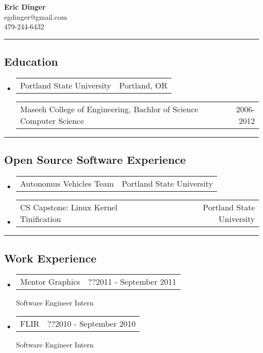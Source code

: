 \documentclass[10pt,letterpaper]{article}
\author{Eric Dinger}
\makeatletter
\newcommand{\heading}[2]
{\begin{tabular*}{\linewidth}{l@{\extracolsep{\fill}}r}
#1 &
#2 \\
\end{tabular*}}
\makeatother
\begin{document}
{\LARGE
\textbf{Eric Dinger}\\
egdinger@gmail.com\\
479-244-6432}
\vspace{.5em}
\hrule
\vspace{-.5em}

\subsection*{Education}
	\begin{itemize}
	\item
		\heading
			{Portland State University}
			{Portland, OR}
		\heading 
			{Maseeh College of Engineering, Bachlor of Science Computer Science}
			{2006-2012}
	\end{itemize}

\hrule

\subsection*{Open Source Software Experience}
	\begin{itemize}
		\item 
		\heading
			{ Autonomus Vehicles Team}
			{Portland State University}
		\item 
		\heading
			{CS Capstone: Linux Kernel Tinification}
			{Portland State University}
	\end{itemize}

\hrule

\subsection*{Work Experience}
	\begin{itemize}
		\item 
		\heading
			{Mentor Graphics}
			{??2011 - September 2011}
		Software Engineer Intern
		\item 
		\heading
			{FLIR}
			{??2010 - September 2010}
			Software Engineer Intern
	\end{itemize}
\end{document}

